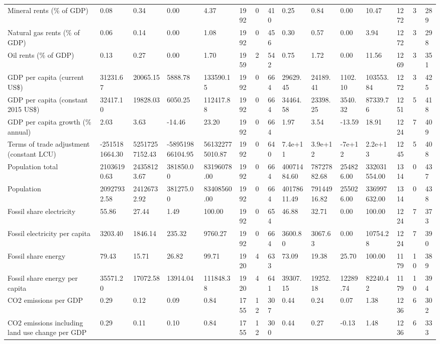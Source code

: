 \begin{longtable}{lllllllllllllll}
\addlinespace
Mineral rents (\% of GDP) & 0.08 & 0.34 & 0.00 & 4.37 & 1992 & 0 & 410 & 0.25 & 0.84 & 0.00 & 10.47 & 1272 & 3 & 289\\
Natural gas rents (\% of GDP) & 0.06 & 0.14 & 0.00 & 1.08 & 1992 & 0 & 456 & 0.30 & 0.57 & 0.00 & 3.94 & 1272 & 3 & 298\\
Oil rents (\% of GDP) & 0.13 & 0.27 & 0.00 & 1.70 & 1959 & 2 & 542 & 0.75 & 1.72 & 0.00 & 11.56 & 1269 & 3 & 351\\
GDP per capita (current US\$) & 31231.67 & 20065.15 & 5888.78 & 133590.15 & 1992 & 0 & 664 & 29629.45 & 24189.41 & 1102.10 & 103553.84 & 1272 & 3 & 425\\
GDP per capita (constant 2015 US\$) & 32417.10 & 19828.03 & 6050.25 & 112417.88 & 1992 & 0 & 664 & 34464.58 & 23398.25 & 3540.32 & 87339.76 & 1251 & 5 & 418\\
\addlinespace
GDP per capita growth (\% annual) & 2.03 & 3.63 & -14.46 & 23.20 & 1992 & 0 & 664 & 1.97 & 3.54 & -13.59 & 18.91 & 1224 & 7 & 409\\
Terms of trade adjustment (constant LCU) & -2515181664.30 & 52517257152.43 & -589519866104.95 & 561322775010.87 & 1992 & 0 & 640 & 7.4e+11 & 3.9e+12 & -7e+12 & 2.2e+13 & 1245 & 5 & 408\\
Population total & 21036190.63 & 24358123.67 & 381850.00 & 83196078.00 & 1992 & 0 & 664 & 40071484.60 & 78727882.68 & 254826.00 & 332031554.00 & 1314 & 0 & 437\\
Population & 20927932.58 & 24126732.92 & 381275.00 & 83408560.00 & 1992 & 0 & 664 & 40178611.49 & 79144916.82 & 255026.00 & 336997632.00 & 1314 & 0 & 438\\
Fossil share electricity & 55.86 & 27.44 & 1.49 & 100.00 & 1992 & 0 & 654 & 46.88 & 32.71 & 0.00 & 100.00 & 1224 & 7 & 373\\
\addlinespace
Fossil electricity per capita & 3203.40 & 1846.14 & 235.32 & 9760.27 & 1992 & 0 & 664 & 3600.80 & 3067.63 & 0.00 & 10754.28 & 1224 & 7 & 390\\
Fossil share energy & 79.43 & 15.71 & 26.82 & 99.71 & 1920 & 4 & 633 & 73.09 & 19.38 & 25.70 & 100.00 & 1179 & 10 & 389\\
Fossil share energy per capita & 35571.20 & 17072.58 & 13914.04 & 111848.38 & 1920 & 4 & 641 & 39307.15 & 19252.18 & 12289.74 & 82240.42 & 1179 & 10 & 394\\
CO2 emissions per GDP & 0.29 & 0.12 & 0.09 & 0.84 & 1755 & 12 & 307 & 0.44 & 0.24 & 0.07 & 1.38 & 1236 & 6 & 302\\
CO2 emissions including land use change per GDP & 0.29 & 0.11 & 0.10 & 0.84 & 1755 & 12 & 300 & 0.44 & 0.27 & -0.13 & 1.48 & 1236 & 6 & 333\\

\end{longtable}
